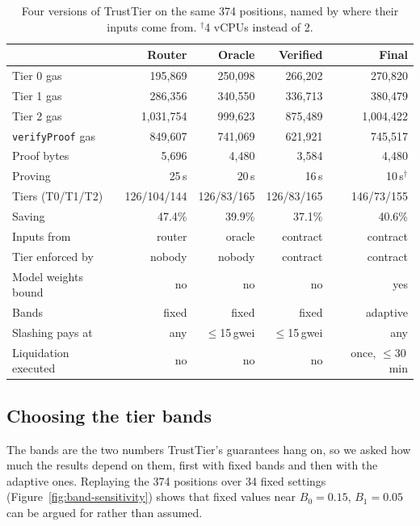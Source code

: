 \documentclass[sigconf,nonacm]{acmart}
\newcommand{\code}[1]{\texttt{\smaller #1}}
\begin{document}
\begin{table}[t]
  \caption{Four versions of TrustTier on the same 374 positions, named by where their inputs come from. $^\dagger$4 vCPUs instead of 2.}
  \label{tab:versions}
  \scriptsize
  \setlength{\tabcolsep}{2pt}
  \begin{tabular}{@{}lrrrr@{}}
    \toprule
    & \textbf{Router} & \textbf{Oracle} & \textbf{Verified} & \textbf{Final} \\
    \midrule
    Tier 0 gas & 195,869 & 250,098 & 266,202 & 270,820 \\
    Tier 1 gas & 286,356 & 340,550 & 336,713 & 380,479 \\
    Tier 2 gas & 1,031,754 & 999,623 & 875,489 & 1,004,422 \\
    \code{verifyProof} gas & 849,607 & 741,069 & 621,921 & 745,517 \\
    Proof bytes & 5,696 & 4,480 & 3,584 & 4,480 \\
    Proving & 25\,s & 20\,s & 16\,s & 10\,s$^\dagger$ \\
    Tiers (T0/T1/T2) & 126/104/144 & 126/83/165 & 126/83/165 & 146/73/155 \\
    Saving & 47.4\% & 39.9\% & 37.1\% & 40.6\% \\
    Inputs from & router & oracle & contract & contract \\
    Tier enforced by & nobody & nobody & contract & contract \\
    Model weights bound & no & no & no & yes \\
    Bands & fixed & fixed & fixed & adaptive \\
    Slashing pays at & any & $\le$15\,gwei & $\le$15\,gwei & any \\
    Liquidation executed & no & no & no & once, $\le$30\,min \\
    \bottomrule
  \end{tabular}
\end{table}

\subsection{Choosing the tier bands}
\label{sec:eval-bands}

The bands are the two numbers TrustTier's guarantees hang on, so we asked how much the results depend on them, first with fixed bands and then with the adaptive ones. Replaying the 374 positions over 34 fixed settings (Figure~\ref{fig:band-sensitivity}) shows that fixed values near $B_0=0.15$, $B_1=0.05$ can be argued for rather than assumed.
\end{document}
